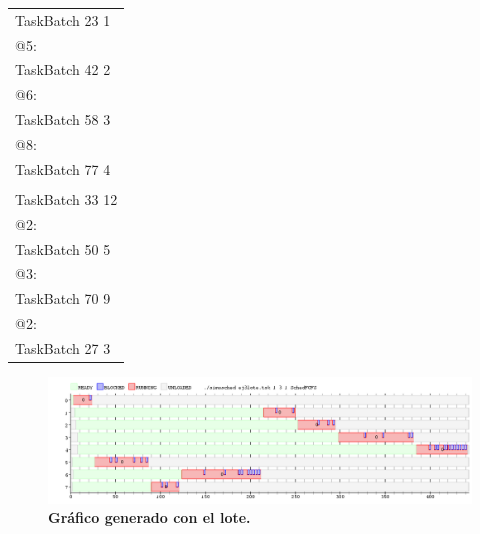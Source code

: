 \begin{center}
	\begin{tabular}{|l|}
		\hline
		TaskBatch 23 1		\\
		@5: 				\\
		TaskBatch 42 2		\\
		@6:					\\
		TaskBatch 58 3		\\
		@8:					\\
		TaskBatch 77 4		\\
							\\
		TaskBatch 33 12		\\
		@2:					\\
		TaskBatch 50 5		\\
		@3:					\\
		TaskBatch 70 9		\\
		@2:					\\
		TaskBatch 27 3		\\
		\hline
	\end{tabular}
\end{center}

\begin{figure}[!h]
	\begin{center}
		\includegraphics[width=500px]{imagenes/ej3.png}
		\caption{\small{\textbf{Gráfico generado con el lote.}}}
		\label{fig:grafico_ej1}
	\end{center}
\end{figure}